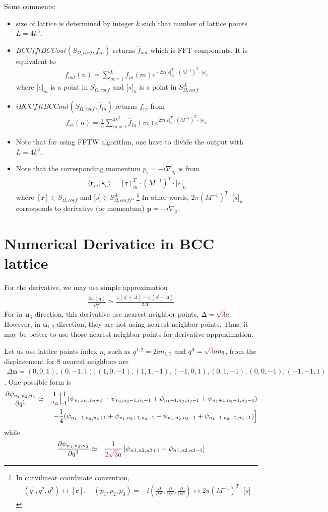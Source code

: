 \documentclass[10pt]{book}
\def\bm{\boldsymbol}
\newcommand{\bea}{\begin{eqnarray}}
\newcommand{\eea}{\end{eqnarray}}
\newcommand{\no}{\nonumber \\}
\newcommand{\del}{\partial}
\def\vn{{\bm n}}
\def\vr{{\bm r}}
\def\la{\langle}
\def\ra{\rangle}
\begin{document}
Some comments: 
\begin{itemize} 
	\item size of lattice is determined by integer $k$ such that number of lattice points
	$L=4k^3$.
	\item $BCCfftBCCout(S_{\Omega,coef},f_{in})$ 
	returns $\hat{f}_{out}$ which is FFT components. 
	It is equivalent to
	\bea 
	\hat{f}_{out}(n)=\sum_{m=1}^{L} f_{in}(m) e^{-2\pi i {\bm [c]}^T_{m}\cdot(M^{-1})^T\cdot {\bm [s]}_{n}}
	\eea   
	where ${\bm [c]}_m$ is a point in $S_{\Omega,coef}$
	and ${\bm [s]}_n$ is a point in $S^A_{\Omega,coef}$
	
	\item $iBCCfftBCCout(S_{\Omega,coef},\hat{f}_{in})$ 
	returns $f_{re}$ from
	\bea 
	f_{re}(n)=\frac{1}{L}\sum_{m=1}^{4k^3} \hat{f}_{in}(m) e^{2\pi i {\bm [c]}^T_{n}\cdot(M^{-1})^T\cdot {\bm [s]}_{m}}
	\eea 
	\item 
	Note that for using FFTW algorithm, one have to divide the output with $L=4k^3$. 	
	\item Note that the corresponding momentum $p_i=-i\nabla_{q_i}$ is from  
	\bea 
	\la {\bm r}_m,{\bm s}_n\ra={[\bm r]}_m^T\cdot (M^{-1})^T\cdot {\bm [s]}_{n}
	\eea 
	where $[\bm r]\in S_{\Omega,coef}$ and ${\bm [s]}\in S_{\Omega,coeff}^A$.
	\footnote{ 
	In curvilinear coordinate convention,
	\bea 
	   (q^1,q^2,q^3)\leftrightarrow [\vr], \quad 
	   (p_1,p_2,p_3)=-i (\frac{\del}{\del q^1},\frac{\del}{\del q^2},\frac{\del}{\del q^3})
	   \leftrightarrow 2\pi (M^{-1})^T\cdot {\bm [s]}
	\eea 
    }
	In other words, $2\pi (M^{-1})^T\cdot {\bm [s]}_{n}$ corresponds to derivative
	(or momentum) ${\bm p}=-i\nabla_{q}$.	
\end{itemize} 






\section{Numerical Derivatice in BCC lattice}
For the derivative, we may use simple approximation 
\bea 
\frac{\del \psi({\bm q})}{\del q^i}\simeq \frac{\psi(q^i+\Delta)-\psi(q^i-\Delta)}{2\Delta}
\eea 
For in ${\bm u}_3$ direction, this derivative use nearest neighbor points, $\Delta={\color{red}\sqrt{3}}a$.
However, in ${\bm u}_{1,2}$ direction, they are not using nearest neighbor points.
Thus, it may be better to use those nearest neighbor points for derivative approximation.
 
Let us use lattice points index $n_i$ such as
$q^{1,2}=2a n_{1,2}$ and $q^3={\color{red}\sqrt{3}}a n_3$,
from the displacement for 8 nearest neighbors are
\bea 
\Delta \vn= (0,0,1),(0,-1,1),(1,0,-1),(1,1,-1),(-1,0,1),(0,1,-1),(0,0,-1),(-1,-1,1)
\eea, 
One possible form is
\bea 
\frac{\del \psi_{n_1,n_2,n_3} }{\del q^1}&\simeq &
   \frac{1}{{\color{red} 2} a}\Big[ \frac{1}{4}
               (\psi_{n_1, n_2,n_3+1} +\psi_{n_1,n_2-1,n_3+1}
         +\psi_{n_1+1,n_2,n_3-1}+\psi_{n_1+1,n_2+1,n_3-1})
   \no & &
  -\frac{1}{4}(\psi_{n_1-1,n_2,n_3+1}+\psi_{n_1,n_2+1,n_3-1}
    +\psi_{n_1,n_2,n_3-1}+\psi_{n_1-1,n_2-1,n_3+1}) \Big] 
\eea 
while 
\bea 
\frac{\del \psi_{n_1,n_2,n_3} }{\del q^3}&\simeq &
  \frac{1}{{\color{red} 2\sqrt{3}} a}\left[\psi_{n1,n2,n3+1}-\psi_{n1,n2,n3-1} \right]  
\eea 
\end{document}

